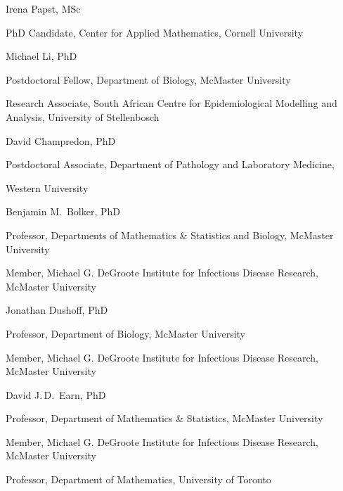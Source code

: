 \documentclass[12pt,letterpaper]{letter}
\begin{document}
\begin{multicols}{2}
\begin{flushleft}
\footnotesize

Irena Papst, MSc
\setlength{\parskip}{0em}

PhD Candidate, Center for Applied Mathematics, Cornell University

\vspace{1em}

Michael Li, PhD

Postdoctoral Fellow, Department of Biology, McMaster University

Research Associate, South African Centre for Epidemiological Modelling and Analysis, University of Stellenbosch

\vspace{1em}

David Champredon, PhD

Postdoctoral Associate, Department of Pathology and Laboratory Medicine,

Western University

\vspace{1em}

\vfill\null
\columnbreak

Benjamin M.\ Bolker, PhD

Professor, Departments of Mathematics \& Statistics and Biology, McMaster University

Member, Michael G. DeGroote Institute for Infectious Disease Research, McMaster University

\vspace{1em}

Jonathan Dushoff, PhD

Professor, Department of Biology, McMaster University

Member, Michael G. DeGroote Institute for Infectious Disease Research, McMaster University

\vspace{1em}

David J.\,D.\ Earn, PhD

Professor, Department of Mathematics \& Statistics, McMaster University

Member, Michael G. DeGroote Institute for Infectious Disease Research, McMaster University

Professor, Department of Mathematics, University of Toronto
\end{flushleft}
\end{multicols}

\thispagestyle{empty}
\end{document}
